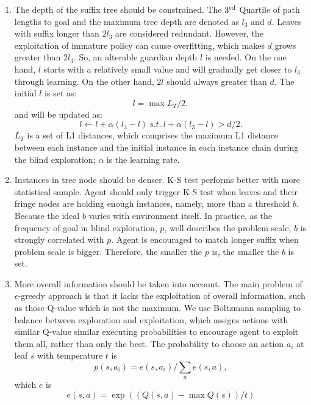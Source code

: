 \documentclass[conference]{IEEEtran}
\begin{document}
	\begin{enumerate}
		\item The depth of the suffix tree should be constrained. The $3^\textnormal{rd}$ Quartile of
		path lengths to goal and the maximum tree depth are denoted as $l_3$ and $d$. Leaves with suffix longer
		than $2l_3$ are considered redundant. However, the exploitation of immature policy can cause overfitting,
		which makes $d$ grows greater than $2l_3$. So, an alterable guardian depth $l$ is needed.
		On the one hand, $l$ starts with a relatively small value and will gradually get closer
		to $l_3$ through learning. On the other hand, $2l$ should always greater than $d$.
		The initial $l$ is set as:
		\begin{equation}
		l = \max{L_T}/2,
		\end{equation}
		and will be updated as:
		\begin{equation}
		l \leftarrow l + \alpha (l_3 - l)  \ s.t. \ l + \alpha (l_3 - l)> d/2. \label{equ:l3}
		\end{equation}
		$L_T$ is a set of L1 distances, which comprises the maximum L1 distance between each
		instance and the initial instance in each instance chain during the blind exploration;
		$\alpha$ is the learning rate.
		
		\item Instances in tree node should be denser. K-S test performs better with more statistical
		sample. Agent should only trigger K-S test when leaves and their fringe nodes are holding enough
		instances, namely, more than a threshold $b$. Because the ideal $b$ varies with environment itself.
		In practice, as the frequency of goal in blind exploration, $p$, well describes the problem scale,
		$b$ is strongly correlated with $p$. Agent is encouraged to match longer suffix when
		problem scale is bigger. Therefore, the smaller the $p$ is, the smaller the $b$ is set.
		
		\item More overall information should be taken into account. The main problem of
		$\epsilon$-greedy approach is that it lacks the exploitation of overall information,
		such as those Q-value which is not the maximum. We use Boltzmann sampling to balance between
		exploration and exploitation, which assigns actions with similar Q-value similar executing
		probabilities to encourage agent to exploit them all, rather than only the best.
		The probability to choose an action $a_i$ at leaf $s$ with temperature $t$ is
		\begin{equation}
		p(s, a_i) = e(s, a_i)/ \sum_a{e(s, a)} \label{equ:boltzmann},
		\end{equation}  
		which $e$ is
		\begin{equation}
		e(s, a) = \exp( (Q(s, a) - \max Q(s))/t )
		\end{equation}
		
	\end{enumerate}
	
\end{document}
